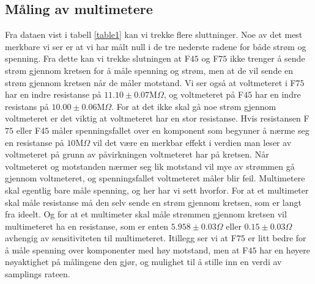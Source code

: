 \documentclass[%
 reprint,
 amsmath,amssymb,
 aps,
]{revtex4-1}
\begin{document}
\subsection{Måling av multimetere}
Fra dataen vist i tabell \ref{table1} kan vi trekke flere sluttninger. Noe av det mest merkbare vi ser er at vi har målt null i de tre nederste radene for både strøm og spenning. Fra dette kan vi trekke slutningen at F$45$ og F$75$ ikke trenger å sende strøm gjennom kretsen for å måle spenning og strøm, men at de vil sende en strøm gjennom kretsen når de måler motstand. Vi ser også at voltmeteret i F$75$ har en indre resistanse på $11.10\pm0.07$M$\Omega$, og voltmeteret på F$45$ har en indre resistans på $10.00\pm0.06$M$\Omega$. For at det ikke skal gå noe strøm gjennom voltmeteret er det viktig at voltmeteret har en stor resistanse. Hvis resistansen F$75$ eller F$45$ måler spenningsfallet over en komponent som begynner å nærme seg en resistanse på $10$M$\Omega$ vil det være en merkbar effekt i verdien man leser av voltmeteret på grunn av påvirkningen voltmeteret har på kretsen. Når voltmeteret og motstanden nærmer seg lik motstand vil mye av strømmen gå gjennom voltmeteret, og spenningsfallet voltmeteret måler blir feil. Multimetere skal egentlig bare måle spenning, og her har vi sett hvorfor. For at et multimeter skal måle resistanse må den selv sende en strøm gjennom kretsen, som er langt fra ideelt. Og for at et multimeter skal måle strømmen gjennom kretsen vil multimeteret ha en resistanse, som er enten $5.958 \pm 0.03\Omega$ eller $0.15 \pm 0.03\Omega$ avhengig av sensitiviteten til multimeteret. Itillegg ser vi at F$75$ er litt bedre for å måle spenning over komponenter med høy motstand, men at F$45$ har en høyere nøyaktighet på målingene den gjør, og mulighet til å stille inn en verdi av samplings rateen.\\
\end{document}
